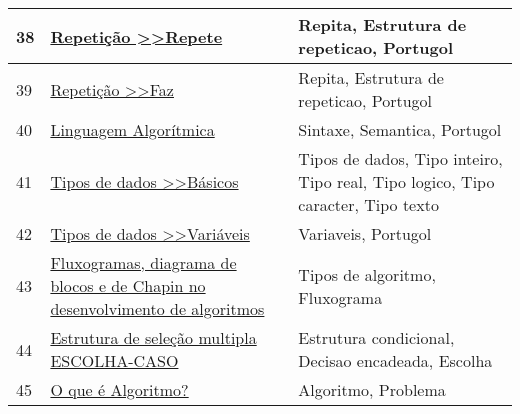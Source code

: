 \begin{longtable}{| p{} | p{} | p{} |}
38  & \href{http://www.dei.estt.ipt.pt/portugol/node/29}{Repetição \textgreater{}\textgreater Repete                                         } & Repita, Estrutura de repeticao, Portugol                                                                                                          \\ \hline
39  & \href{http://www.dei.estt.ipt.pt/portugol/node/30}{Repetição \textgreater{}\textgreater Faz                                            } & Repita, Estrutura de repeticao, Portugol                                                                                                          \\ \hline
40  & \href{http://www.dei.estt.ipt.pt/portugol/node/6}{Linguagem Algorítmica                                                               } & Sintaxe, Semantica, Portugol                                                                                                                      \\ \hline
41  & \href{http://www.dei.estt.ipt.pt/portugol/node/8}{Tipos de dados \textgreater{}\textgreater Básicos                                   } & Tipos de dados, Tipo inteiro, Tipo real, Tipo logico, Tipo caracter, Tipo texto                                                                   \\ \hline
42  & \href{http://www.dei.estt.ipt.pt/portugol/node/9}{Tipos de dados \textgreater{}\textgreater Variáveis                                 } & Variaveis, Portugol                                                                                                                               \\ \hline
43  & \href{http://www.devmedia.com.br/fluxogramas-diagrama-de-blocos-e-de-chapin-no-desenvolvimento-de-algoritmos/28550}{Fluxogramas, diagrama de blocos e de Chapin no desenvolvimento de algoritmos        } & Tipos de algoritmo, Fluxograma                                                                                                                    \\ \hline
44  & \href{http://www.dicasdeprogramacao.com.br/estrutura-de-selecao-multipla-escolha-caso/}{Estrutura de seleção multipla ESCOLHA-CASO                                          } & Estrutura condicional, Decisao encadeada, Escolha                                                                                                 \\ \hline
45  & \href{http://www.dicasdeprogramacao.com.br/o-que-e-algoritmo/}{O que é Algoritmo?                                                                  } & Algoritmo, Problema                                                                                                                               \\ \hline

\end{longtable}
